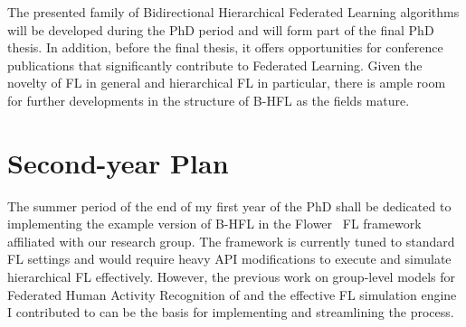 
The presented family of Bidirectional Hierarchical Federated Learning algorithms will be developed during the PhD period and will form part of the final PhD thesis. In addition, before the final thesis, it offers opportunities for conference publications that significantly contribute to Federated Learning. Given the novelty of FL in general and hierarchical FL in particular, there is ample room for further developments in the structure of B-HFL as the fields mature.

\section{Second-year Plan}\label{sec:timeplan:secondYear}

The summer period of the end of my first year of the PhD shall be dedicated to implementing the example version of B-HFL in the Flower~\citep{Flower} FL framework affiliated with our research group. The framework is currently tuned to standard FL settings and would require heavy API modifications to execute and simulate hierarchical FL effectively. However, the previous work on group-level models for Federated Human Activity Recognition of \citet{OperaWorkshop} and the effective FL simulation engine I contributed to can be the basis for implementing and streamlining the process.

